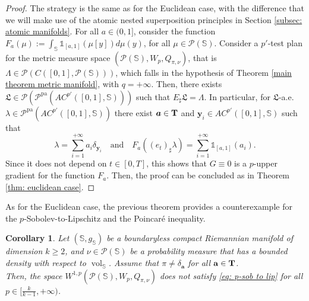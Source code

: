 \documentclass[10pt,leqno]{amsart}
\numberwithin{equation}{section}
\newtheorem{co}[teorema]{Corollary}
\newcommand{\PP}{\mathcal{P}}
\newcommand{\PPpa}{\PP^{\operatorname{pa}}}
\newcommand{\Ss}{\mathbb{S}}
\begin{document}
\begin{proof}
    The strategy is the same as for the Euclidean case, with the difference that we will make use of the atomic nested superposition principles in Section \ref{subsec: atomic manifolds}. For all $a\in(0,1]$, consider the function $F_a(\mu):= \int_{\Ss} \mathds{1}_{[a,1]}(\mu[y]) d\mu(y)$, for all $\mu\in \PP(\Ss)$. Consider a $p'$-test plan for the metric measure space $(\PP(\Ss),W_p,Q_{\pi,\nu})$, that is $\Lambda\in \PP(C([0,1],\PP(\Ss)))$, which falls in the hypothesis of Theorem \ref{main theorem metric manifold}, with $q=+\infty$. Then, there exists $\mathfrak{L}\in \PP(\PPpa(AC^{p'}([0,1],\Ss)))$ such that $E_\sharp \mathfrak{L} = \Lambda$. In particular, for $\mathfrak{L}$-a.e. $\lambda \in \PPpa(AC^{p'}([0,1],\Ss))$ there exist $\boldsymbol{a}\in \bold{T}$ and $\boldsymbol{y}_i \in AC^{p'}([0,1],\Ss)$ such that 
    \[\lambda = \sum_{i=1}^{+\infty}a_i\delta_{\boldsymbol{y}_i} \quad \text{and} \quad F_a((e_t)_\sharp \lambda) = \sum_{i=1}^{+\infty} \mathds{1}_{[a,1]}(a_i).\]
    Since it does not depend on $t\in[0,T]$, this shows that $G\equiv 0$ is a $p$-upper gradient for the function $F_a$. Then, the proof can be concluded as in Theorem \ref{thm: euclidean case}.
\end{proof}

As for the Euclidean case, the previous theorem provides a counterexample for the $p$-Sobolev-to-Lipschitz and the Poincar\'e inequality.

\begin{co}\label{co: manifold sob to lip}
    Let $(\mathbb{S},g_{\mathbb{S}})$ be a boundaryless compact Riemannian manifold of dimension $k\geq 2$, and $\nu\in \PP(\mathbb{S})$ be a probability measure that has a bounded density with respect to $\operatorname{vol}_{\mathbb{S}}$. Assume that $\pi \neq \delta_{\mathbf{a}}$ for all $\mathbf{a}\in \bold{T}$.
    \\
    Then, the space $W^{1,p}(\PP(\mathbb{S}),W_p,Q_{\pi,\nu})$ does not satisfy \eqref{eq: p-sob to lip} for all $p \in [\frac{k}{k-1},+\infty)$.
\end{co}
\end{document}
